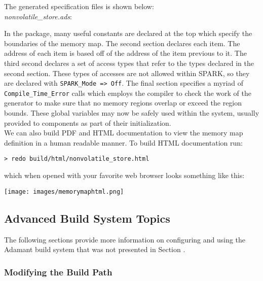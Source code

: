 The generated specification files is shown below: \\

\textit{nonvolatile\_store.ads}:

In the package, many useful constants are declared at the top which specify the boundaries of the memory map. The second section declares each item. The address of each item is based off of the address of the item previous to it. The third second declares a set of access types that refer to the types declared in the second section. These types of accesses are not allowed within SPARK, so they are declared with \texttt{SPARK\_Mode => Off}. The final section specifies a myriad of \texttt{Compile\_Time\_Error} calls which employs the compiler to check the work of the generator to make sure that no memory regions overlap or exceed the region bounds. These global variables may now be safely used within the system, usually provided to components as part of their initialization. \\

We can also build PDF and HTML documentation to view the memory map definition in a human readable manner. To build HTML documentation run:

\vspace{5mm} %
\begin{verbatim}
> redo build/html/nonvolatile_store.html
\end{verbatim}
\vspace{5mm} %

which when opened with your favorite web browser looks something like this:

\vspace{5mm} %
\texttt{[image: images/memorymaphtml.png]}
\vspace{5mm} %

\subsection{Advanced Build System Topics}

The following sections provide more information on configuring and using the Adamant build system that was not presented in Section \label{Using the Build System}.

\subsubsection{Modifying the Build Path} \label{Modifying Build Path}

